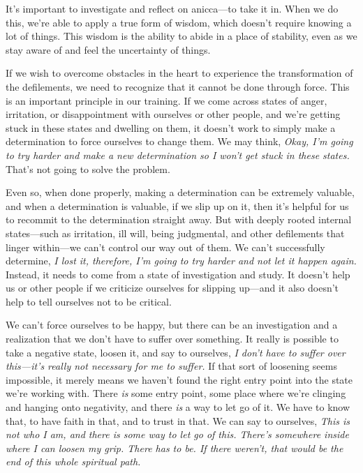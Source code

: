 It's important to investigate and reflect on anicca---to take it in. 
When we do this, we're able to apply a true form of wisdom, which 
doesn't require knowing a lot of things. This wisdom is the ability to 
abide in a place of stability, even as we stay aware of and feel the 
uncertainty of things.


If we wish to overcome obstacles in the heart to experience the 
transformation of the defilements, we need to recognize that it cannot 
be done through force. This is an important principle in our training. 
If we come across states of anger, irritation, or disappointment with 
ourselves or other people, and we're getting stuck in these states and 
dwelling on them, it doesn't work to simply make a determination to 
force ourselves to change them. We may think, \emph{Okay, I'm going to 
try harder and make a new determination so I won't get stuck in these 
states.} That's not going to solve the problem.

Even so, when done properly, making a determination can be extremely 
valuable, and when a determination is valuable, if we slip up on it, 
then it's helpful for us to recommit to the determination straight 
away. But with deeply rooted internal states---such as irritation, ill 
will, being judgmental, and other defilements that linger within---we 
can't control our way out of them. We can't successfully determine, 
\emph{I lost it, therefore, I'm going to try harder and not let it 
happen again.} Instead, it needs to come from a state of investigation 
and study. It doesn't help us or other people if we criticize ourselves 
for slipping up---and it also doesn't help to tell ourselves not to be 
critical.

We can't force ourselves to be happy, but there can be an investigation 
and a realization that we don't have to suffer over something. It 
really is possible to take a negative state, loosen it, and say to 
ourselves, \emph{I don't have to suffer over this---it's really not 
necessary for me to suffer.} If that sort of loosening seems 
impossible, it merely means we haven't found the right entry point into 
the state we're working with. There \emph{is} some entry point, some 
place where we're clinging and hanging onto negativity, and there 
\emph{is} a way to let go of it. We have to know that, to have faith in 
that, and to trust in that. We can say to ourselves, \emph{This is not 
who I am, and there is some way to let go of this. There's somewhere 
inside where I can loosen my grip. There has to be. If there weren't, 
that would be the end of this whole spiritual path.}

